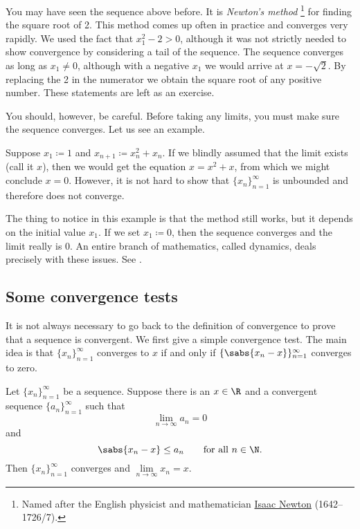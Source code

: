 You may have seen the sequence above before.  It is
\emph{Newton's method}%
\footnote{%
Named after the English physicist and mathematician
\href{https://en.wikipedia.org/wiki/Isaac_Newton}{Isaac Newton}
(1642--1726/7).}
for finding the square root of 2.  This method comes up often in
practice and converges very rapidly.  We used the fact that
$x_1^2 -2 >0$, although it was not strictly needed to show convergence by
considering a tail of the sequence.
The sequence converges as long as $x_1 \not= 0$, although with a negative $x_1$
we would arrive at $x=-\sqrt{2}$.  By replacing the 2 in the numerator we 
obtain the square root of any positive number.  These statements are left as
an exercise.

You should, however, be careful.  Before taking any limits, you must
make sure the sequence converges.  Let us see an example.

\begin{example}
Suppose $x_1 \coloneqq 1$ and $x_{n+1} \coloneqq x_n^2+x_n$.
If we blindly assumed that the limit exists (call it $x$), then we
would get the equation $x = x^2+x$, from which we might
conclude $x=0$.  However, it is not hard
to show that $\{ x_n \}_{n=1}^\infty$ is unbounded and therefore does not converge.

The thing to notice in this example is that the method still works, but
it depends on the initial value $x_1$.  If we set $x_1 \coloneqq 0$,
then the sequence converges and the limit really is 0.
An entire branch of mathematics, called dynamics, deals precisely with these
issues.
See
.
\end{example}

\subsection{Some convergence tests}

It is not always necessary to go back to the definition of convergence
to prove that a sequence is convergent.  We first give a simple convergence test.
The main idea is that 
$\{ x_n \}_{n=1}^\infty$ converges to $x$ if and only if 
$\{ \sabs{ x_n - x } \}_{n=1}^\infty$ converges to zero.

\begin{prop} \label{convzero:prop}
Let $\{ x_n \}_{n=1}^\infty$ be a sequence. 
Suppose there is an $x \in \R$
and a convergent sequence $\{ a_n \}_{n=1}^\infty$
such that
\begin{equation*}
\lim_{n\to\infty} a_n = 0
\end{equation*}
and 
\begin{equation*}
\sabs{x_n - x} \leq a_n
\qquad
\text{for all $n \in \N$.}
\end{equation*}
Then $\{ x_n \}_{n=1}^\infty$ converges and $\lim\limits_{n\to\infty} x_n = x$.
\end{prop}

